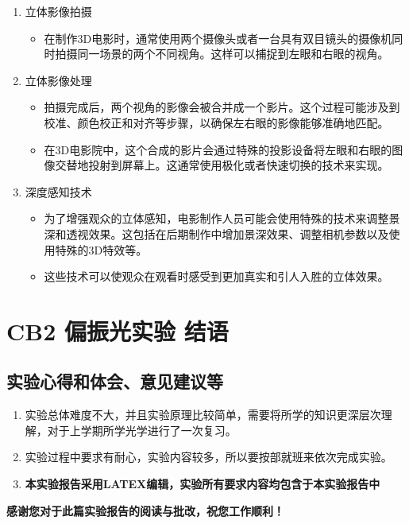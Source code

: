 \documentclass[dvipsnames, svgnames,a4paper,11pt]{article}
\begin{document}
\begin{enumerate}
\item 立体影像拍摄
\begin{itemize}
  \item 在制作3D电影时，通常使用两个摄像头或者一台具有双目镜头的摄像机同时拍摄同一场景的两个不同视角。这样可以捕捉到左眼和右眼的视角。
\end{itemize}

\item 立体影像处理
\begin{itemize}
  \item 拍摄完成后，两个视角的影像会被合并成一个影片。这个过程可能涉及到校准、颜色校正和对齐等步骤，以确保左右眼的影像能够准确地匹配。
  \item 在3D电影院中，这个合成的影片会通过特殊的投影设备将左眼和右眼的图像交替地投射到屏幕上。这通常使用极化或者快速切换的技术来实现。
\end{itemize}

\item 深度感知技术
\begin{itemize}
  \item 为了增强观众的立体感知，电影制作人员可能会使用特殊的技术来调整景深和透视效果。这包括在后期制作中增加景深效果、调整相机参数以及使用特殊的3D特效等。
  \item 这些技术可以使观众在观看时感受到更加真实和引人入胜的立体效果。
\end{itemize}\end{enumerate}

	
	
	\clearpage
	
	\section{ CB2 偏振光实验 \quad\heiti 结语}
	
	\subsection{实验心得和体会、意见建议等}
	\begin{enumerate}
		\item 实验总体难度不大，并且实验原理比较简单，需要将所学的知识更深层次理解，对于上学期所学光学进行了一次复习。
		\item 实验过程中要求有耐心，实验内容较多，所以要按部就班来依次完成实验。
		\item \textbf{本实验报告采用LATEX编辑，实验所有要求内容均包含于本实验报告中}
		
	\end{enumerate}
	 \quad \large \textbf{感谢您对于此篇实验报告的阅读与批改，祝您工作顺利！}
	
\end{document}
